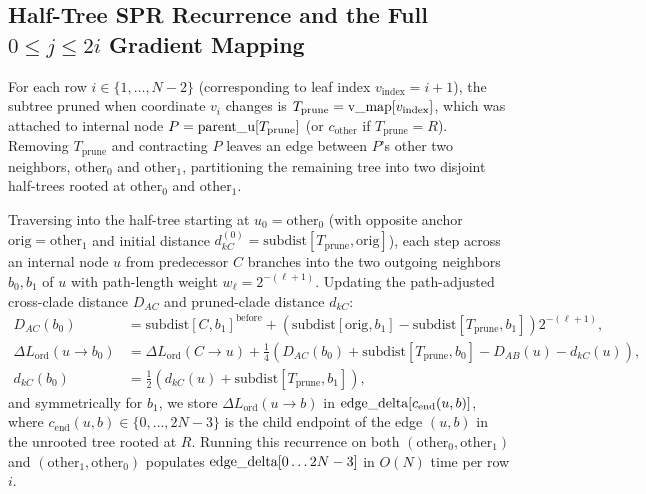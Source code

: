 \documentclass[11pt,a4paper]{article}
\makeatletter
\DeclareRobustCommand{\_}{\ifmmode\nfss@text{\textunderscore}\else\textunderscore\allowbreak\fi}
\theoremstyle{definition}
\makeatother
\begin{document}
\subsection{Half-Tree SPR Recurrence and the Full $0 \le j \le 2i$ Gradient Mapping}

For each row $i \in \{1, \dots, N-2\}$ (corresponding to leaf index $v_{\text{index}} = i + 1$), the subtree pruned when coordinate $v_i$ changes is $T_{\text{prune}} = \text{v\_map}[v_{\text{index}}]$, which was attached to internal node $P = \text{parent\_u}[T_{\text{prune}}]$ (or $c_{\text{other}}$ if $T_{\text{prune}} = R$). Removing $T_{\text{prune}}$ and contracting $P$ leaves an edge between $P$'s other two neighbors, $\text{other}_0$ and $\text{other}_1$, partitioning the remaining tree into two disjoint half-trees rooted at $\text{other}_0$ and $\text{other}_1$.

Traversing into the half-tree starting at $u_0 = \text{other}_0$ (with opposite anchor $\text{orig} = \text{other}_1$ and initial distance $d_{kC}^{(0)} = \text{subdist}[T_{\text{prune}}, \text{orig}]$), each step across an internal node $u$ from predecessor $C$ branches into the two outgoing neighbors $b_0, b_1$ of $u$ with path-length weight $w_\ell = 2^{-(\ell + 1)}$. Updating the path-adjusted cross-clade distance $D_{AC}$ and pruned-clade distance $d_{kC}$:
\begin{align}
D_{AC}(b_0) &= \text{subdist}[C, b_1]^{\text{before}} + \left(\text{subdist}[\text{orig}, b_1] - \text{subdist}[T_{\text{prune}}, b_1]\right) 2^{-(\ell+1)}, \nonumber \\
\Delta L_{\text{ord}}(u \to b_0) &= \Delta L_{\text{ord}}(C \to u) + \frac{1}{4}\left(D_{AC}(b_0) + \text{subdist}[T_{\text{prune}}, b_0] - D_{AB}(u) - d_{kC}(u)\right), \nonumber \\
d_{kC}(b_0) &= \frac{1}{2}\left(d_{kC}(u) + \text{subdist}[T_{\text{prune}}, b_1]\right),
\label{eq:spr_recurrence}
\end{align}
and symmetrically for $b_1$, we store $\Delta L_{\text{ord}}(u \to b)$ in $\text{edge\_delta}[c_{\text{end}}(u, b)]$, where $c_{\text{end}}(u, b) \in \{0, \dots, 2N-3\}$ is the child endpoint of the edge $(u, b)$ in the unrooted tree rooted at $R$. Running this recurrence on both $(\text{other}_0, \text{other}_1)$ and $(\text{other}_1, \text{other}_0)$ populates $\text{edge\_delta}[0 \dots 2N-3]$ in $O(N)$ time per row $i$.
\end{document}
